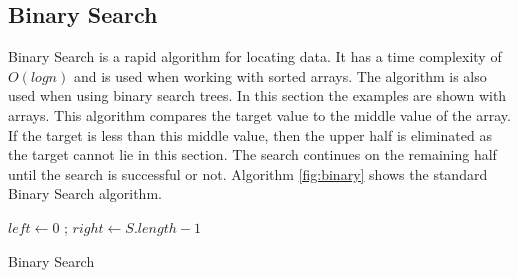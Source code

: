 \documentclass[conference]{IEEEtran}
\begin{document}
\subsection{Binary Search}
Binary Search is a rapid algorithm for locating data. It has a time complexity of $O(log{n})$ and is used when working with sorted arrays. The algorithm is also used when using binary search trees. In this section the examples are shown with arrays. This algorithm compares the target value to the middle value of the array. If the target is less than this middle value, then the upper half is eliminated as the target cannot lie in this section. The search continues on the remaining half until the search is successful or not. Algorithm \ref{fig:binary} shows the standard Binary Search algorithm.
\IncMargin{1em}
\begin{algorithm}[h]
\LinesNumbered
	
	$left \longleftarrow $0 ; $right \longleftarrow S.length-1$\\
\caption{Binary Search}
\label{fig:binary}
\end{algorithm}\DecMargin{1em}
\end{document}
